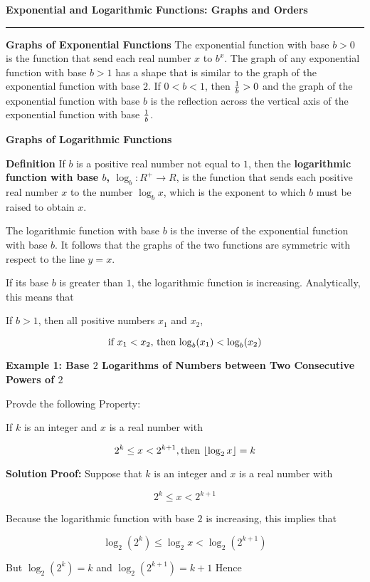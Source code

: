 {\bf Exponential and Logarithmic Functions: Graphs and Orders}
\vskip 1mm
\hrule

\vskip 3mm
{\bf Graphs of Exponential Functions}
The exponential function with base $b>0$ is the function that send each real number $x$ to $b^x$. The graph of any exponential function with base $b>1$ has a shape that is similar to the graph of the exponential function with base $2$. If $0<b<1$, then ${1\over b}>0$ and the graph of the exponential function with base $b$ is the reflection across the vertical axis of the exponential function with base ${1\over b}$.

\filbreak
\vskip 1cm
{\bf Graphs of Logarithmic Functions}

\vskip 3mm
{\bf Definition}
\vskip 1mm
If $b$ is a positive real number not equal to $1$, then the {\bf logarithmic function with base $b$, $\log_b:R^+\to R$}, is the function that sends each positive real number $x$ to the number $\log_bx$, which is the exponent to which $b$ must be raised to obtain $x$. 

\vskip 1mm
The logarithmic function with base $b$ is the inverse of the exponential function with base $b$. It follows that the graphs of the two functions are symmetric with respect to the line $y=x$.

\vskip 2mm
If its base $b$ is greater than $1$, the logarithmic function is increasing. Analytically, this means that

\vskip 2mm
If $b>1$, then all positive numbers $x_1$ and $x_2$,

$$\hbox{if $x_1<x_2$, then $\log_b(x_1)<\log_b(x_2)$}$$

\filbreak
\vskip 1cm
{\bf Example 1: Base $2$ Logarithms of Numbers between Two Consecutive Powers of $2$}

\vskip 3mm
Provde the following Property:

\vskip 1mm
If $k$ is an integer and $x$ is a real number with

$$2^k\leq x < 2^{k+1}, \hbox{then }\lfloor\log_2x\rfloor=k$$

\vskip 3mm
{\bf Solution}
\vskip 1mm
{\bf Proof:}
\vskip 1mm
Suppose that $k$ is an integer and $x$ is a real number with

$$2^k\leq x<2^{k+1}$$

Because the logarithmic function with base $2$ is increasing, this implies that

$$\log_2(2^k)\leq\log_2x<\log_2(2^{k+1})$$

But $\log_2(2^k)=k$ and $\log_2(2^{k+1})=k+1$ Hence

